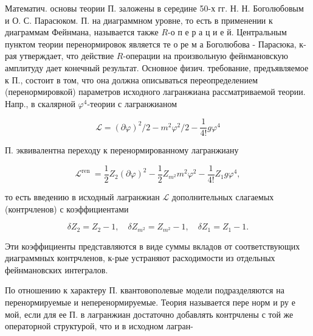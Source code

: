 \documentclass[10pt]{article}
\begin{document}
Математич. основы теории П. заложены в середине 50-х гг. Н. Н. Боголюбовым и О. С. Парасюком. П. на диаграммном уровне, то есть в применении к диаграммам Фейнмана, называется также $R$-о п е р а ц и е й. Центральным пунктом теории перенормировок является те о ре м а Боголюбова - Парасюка, к-рая утверждает, что действие $R$-операции на произвольную фейнмановскую амплитуду дает конечный результат. Основное физич. требование, предъявляемое к П., состоит в том, что она должна описываться переопределением (перенормировкой) параметров исходного лагранжиана рассматриваемой теории. Напр., в скалярной $\varphi^{4}$-теории с лагранжианом



\[

\mathscr{L}=(\partial \varphi)^{2} / 2-m^{2} \varphi^{2} / 2-\frac{1}{4 !} g \varphi^{4}

\]



П. эквивалентна переходу к перенормированному лагранжиану



\[

\mathscr{L}^{\text {ren }}=\frac{1}{2} Z_{2}(\partial \varphi)^{2}-\frac{1}{2} Z_{m^{2}} m^{2} \varphi^{2}-\frac{1}{4 !} Z_{1} g \varphi^{4},

\]



то есть введению в исходный лагранжиан $\mathscr{L}$ дополнительных слагаемых (контрчленов) с коэффициентами



\[

\delta Z_{2}=Z_{2}-1, \quad \delta Z_{m^{2}}=Z_{m^{2}}-1, \quad \delta Z_{1}=Z_{1}-1 .

\]



Эти коэффициенты представляются в виде суммы вкладов от соответствующих диаграммных контрчленов, к-рые устраняют расходимости из отдельных фейнмановских интегралов.



По отношению к характеру П. квантовополевые модели подразделяются на перенормируемые и неперенормируемые. Теория называется пере норм и ру е мой, если для ее П. в лагранжиан достаточно добавлять контрчлены с той же операторной структурой, что и в исходном лагран-
\end{document}
